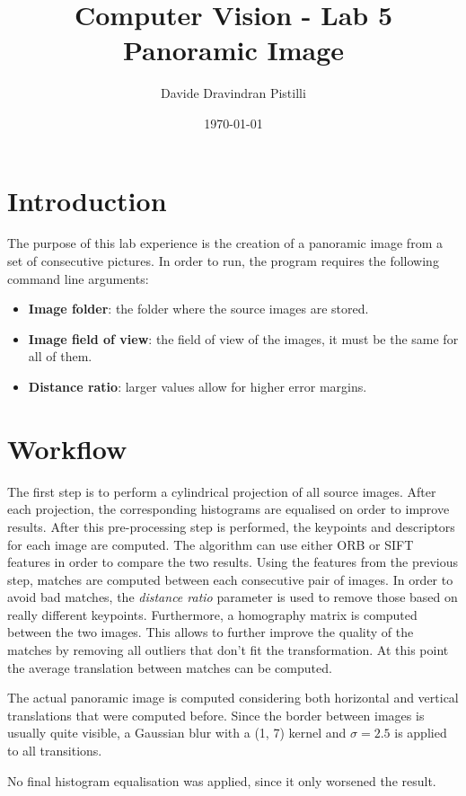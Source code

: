 \documentclass{article}
\title{Computer Vision - Lab 5 \\ Panoramic Image} %
\author{Davide Dravindran Pistilli} %
\date{\today} %
\begin{document}
\maketitle %

\section{Introduction}
The purpose of this lab experience is the creation of a panoramic image from a set of consecutive pictures.
In order to run, the program requires the following command line arguments:
\begin{itemize}
\item \textbf{Image folder}: the folder where the source images are stored.
\item \textbf{Image field of view}: the field of view of the images, it must be the same for all of them.
\item \textbf{Distance ratio}: larger values allow for higher error margins.
\end{itemize}

\section{Workflow}
The first step is to perform a cylindrical projection of all source images. After each projection, the corresponding histograms are equalised on order to improve results.
After this pre-processing step is performed, the keypoints and descriptors for each image are computed. The algorithm can use either ORB or SIFT features in order to compare the two results.
Using the features from the previous step, matches are computed between each consecutive pair of images. In order to avoid bad matches, the \textit{distance ratio} parameter is used to remove those based on really different keypoints.
Furthermore, a homography matrix is computed between the two images. This allows to further improve the quality of the matches by removing all outliers that don't fit the transformation.
At this point the average translation between matches can be computed.

The actual panoramic image is computed considering both horizontal and vertical translations that were computed before. Since the border between images is usually quite visible, a Gaussian blur with a (1, 7) kernel and $\sigma=2.5$ is applied to all transitions.

No final histogram equalisation was applied, since it only worsened the result.
\end{document}

